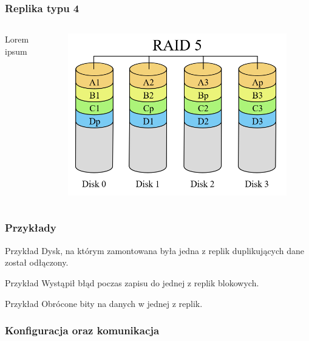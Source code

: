 \documentclass{beamer}
\begin{document}
\begin{frame}
	\frametitle{Replika typu 4}
	\begin{columns}
		Lorem ipsum
		\begin{figure}
			\includegraphics[scale=0.2]{raid-5.png}
		\end{figure}
	\end{columns}
\end{frame}
		
	\begin{frame}
		\frametitle{Przykłady}
		\begin{block}{Przykład}
			Dysk, na którym zamontowana była jedna z replik duplikujących dane został odłączony. 
		\end{block}
		\pause
		\begin{block}{Przykład}
			Wystąpił błąd poczas zapisu do jednej z replik blokowych.
		\end{block}
		\pause
		\begin{block}{Przykład}
			Obrócone bity na danych w jednej z replik.
		\end{block}
	\end{frame}
	
	\begin{frame}
		\frametitle{Konfiguracja oraz komunikacja}

	\end{frame}
\end{document}
